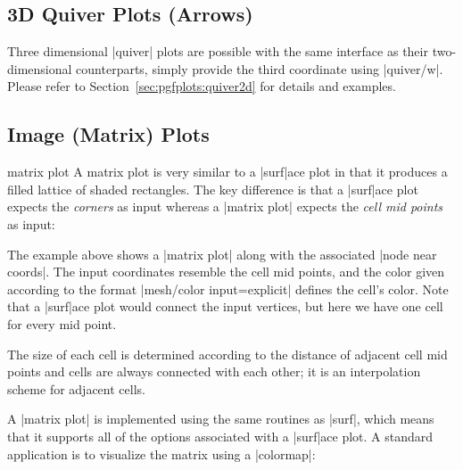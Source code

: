 {{}%

\subsection{3D Quiver Plots (Arrows)}
Three dimensional |quiver| plots are possible with the same interface as their two-dimensional counterparts, simply provide the third coordinate using |quiver/w|. Please refer to Section~\ref{sec:pgfplots:quiver2d} for details and examples.

\subsection{Image (Matrix) Plots}
\label{sec:imagesc}

\begin{plottype}[/pgfplots]{matrix plot}
	A matrix plot is very similar to a |surf|ace plot in that it produces a filled lattice of shaded rectangles. The key difference is that a |surf|ace plot expects the \emph{corners} as input whereas a |matrix plot| expects the \emph{cell mid points} as input:
\begin{codeexample}[]
\end{codeexample}
	The example above shows a |matrix plot| along with the associated |node near coords|. The input coordinates resemble the cell mid points, and the color given according to the format |mesh/color input=explicit| defines the cell's color. Note that a |surf|ace plot would connect the input vertices, but here we have one cell for every mid point.
	
	The size of each cell is determined according to the distance of adjacent cell mid points and cells are always connected with each other; it is an interpolation scheme for adjacent cells. 

	A |matrix plot| is implemented using the same routines as |surf|, which means that it supports all of the options associated with a |surf|ace plot. A standard application is to visualize the matrix using a |colormap|:
\begin{codeexample}[]
\begin{tikzpicture}
\begin{axis}[enlargelimits=false,colorbar]


\end{axis}
\end{tikzpicture}
\end{codeexample}
\end{plottype}}
